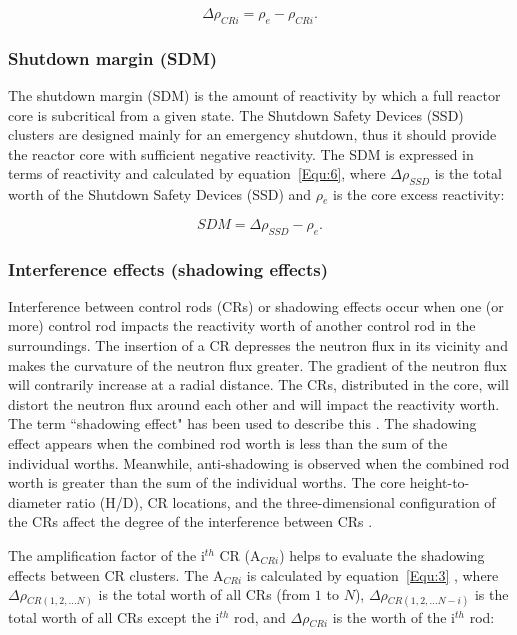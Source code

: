 \begin{equation}
\label{Equ:2}
{{\Delta}{\rho}_{CRi}}={{\rho}_{e}}-{{\rho}_{CRi}}.
\end{equation}

\subsubsection{Shutdown margin (SDM)}

The shutdown margin (SDM) is the amount of reactivity by which a full reactor core is subcritical from a given state. The Shutdown Safety Devices (SSD) clusters are designed mainly for an emergency shutdown, thus it should 
provide the reactor core with sufficient negative reactivity. The SDM is expressed in terms of reactivity and calculated by equation~\ref{Equ:6}, where $\Delta\rho_{SSD}$ is the total worth of the Shutdown Safety Devices (SSD) and $\rho$$_e$ is the core excess reactivity:

\begin{equation}
\label{Equ:6}
{SDM}={{\Delta}{\rho}_{SSD}}-{{\rho}_{e}}.
\end{equation}

\subsubsection{Interference effects (shadowing effects)}

Interference between control rods (CRs) or shadowing effects occur when one 
(or more) control rod impacts the reactivity worth of another control rod in 
the surroundings. 
The insertion of a CR depresses the neutron flux
in its vicinity and makes the curvature of the neutron flux greater. The gradient
of the neutron flux will contrarily increase at a radial distance. The CRs, distributed in the core,
will distort the neutron flux around each other and will impact the reactivity worth.
The term ``shadowing effect" has been used to describe this \cite{oka2014nuclear}.
The shadowing effect appears when the combined rod worth
is less than the sum of the individual worths. Meanwhile, anti-shadowing is observed 
when the combined rod worth is greater than the sum of the individual worths.
The core height-to-diameter ratio (H/D), CR locations, and the three-dimensional configuration 
of the CRs affect the degree of the interference between CRs \cite{oka2014nuclear}. 

The amplification factor of the i$^{th}$ CR (A$_{CRi}$) helps to evaluate the shadowing effects between CR clusters. The A$_{CRi}$ is calculated by equation~\ref{Equ:3} \cite{vcerba2017optimization}, where $\Delta\rho$$_{CR(1,2,\ldots N)}$ is the total worth of all CRs (from $1$ to $N$), $\Delta\rho$$_{CR(1,2,\ldots N-i)}$ is the total worth of all CRs except the i$^{th}$ rod, and $\Delta\rho$$_{CRi}$ is the worth of the i$^{th}$ rod:

